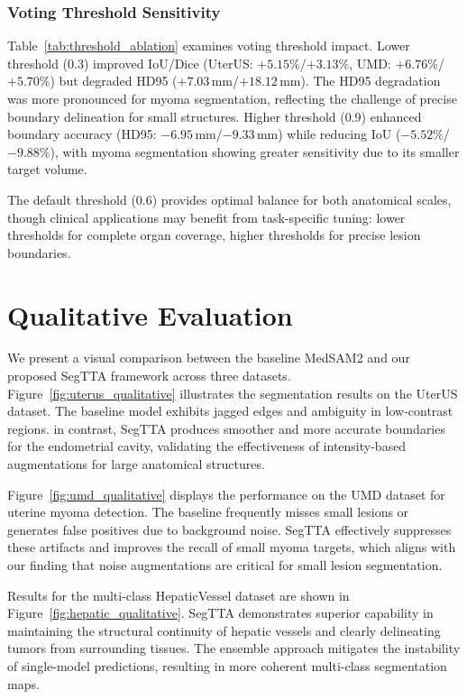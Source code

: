\documentclass{article}
\newcommand{\uterusLowIoU}{+5.15}
\newcommand{\uterusLowDice}{+3.13}
\newcommand{\umdLowIoU}{+6.76}
\newcommand{\umdLowDice}{+5.70}
\newcommand{\uterusLowHD}{+7.03}
\newcommand{\umdLowHD}{+18.12}
\newcommand{\uterusHighIoU}{-5.52}
\newcommand{\uterusHighHD}{-6.95}
\newcommand{\umdHighIoU}{-9.88}
\newcommand{\umdHighHD}{-9.33}
\begin{document}
\subsubsection{Voting Threshold Sensitivity}

Table~\ref{tab:threshold_ablation} examines voting threshold impact. 
Lower threshold (0.3) improved IoU/Dice (UterUS: $\uterusLowIoU\%$/$\uterusLowDice\%$, 
UMD: $\umdLowIoU\%$/$\umdLowDice\%$) but degraded HD95 
($\uterusLowHD$\,mm/$\umdLowHD$\,mm). 
The HD95 degradation was more pronounced for myoma segmentation, reflecting the challenge of precise boundary delineation for small structures. 
Higher threshold (0.9) enhanced boundary accuracy (HD95: $\uterusHighHD$\,mm/$\umdHighHD$\,mm) 
while reducing IoU ($\uterusHighIoU\%$/$\umdHighIoU\%$), with myoma segmentation showing greater sensitivity due to its smaller target volume.

The default threshold (0.6) provides optimal balance for both anatomical scales, though clinical applications may benefit from task-specific tuning: lower thresholds for complete organ coverage, higher thresholds for precise lesion boundaries.

\section{Qualitative Evaluation}

We present a visual comparison between the baseline MedSAM2 and our proposed SegTTA framework across three datasets. Figure~\ref{fig:uterus_qualitative} illustrates the segmentation results on the UterUS dataset. The baseline model exhibits jagged edges and ambiguity in low-contrast regions. in contrast, SegTTA produces smoother and more accurate boundaries for the endometrial cavity, validating the effectiveness of intensity-based augmentations for large anatomical structures.

Figure~\ref{fig:umd_qualitative} displays the performance on the UMD dataset for uterine myoma detection. The baseline frequently misses small lesions or generates false positives due to background noise. SegTTA effectively suppresses these artifacts and improves the recall of small myoma targets, which aligns with our finding that noise augmentations are critical for small lesion segmentation.

Results for the multi-class HepaticVessel dataset are shown in Figure~\ref{fig:hepatic_qualitative}. SegTTA demonstrates superior capability in maintaining the structural continuity of hepatic vessels and clearly delineating tumors from surrounding tissues. The ensemble approach mitigates the instability of single-model predictions, resulting in more coherent multi-class segmentation maps.
\end{document}
